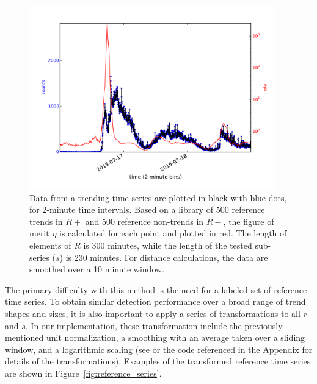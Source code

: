 \documentclass{article}
\begin{document}
\begin{figure}
\begin{center}
\includegraphics[width=0.95\textwidth]{fig/nikolov_trend.pdf} 
\caption{Data from a trending time series are plotted in black with blue dots, for
2-minute time intervals. Based on a library of 500 reference trends in $R+$
and 500 reference non-trends in $R-$, the figure of
merit $\eta$ is calculated for each point and plotted in red. The length of
elements of $R$ is 300 minutes, while the length of the tested sub-series ($s$) is 230
minutes. For distance calculations, the data are smoothed over a 10 minute window.
}
\label{fig:nikolov_eta} 
\end{center}
\end{figure}

The primary difficulty with this method is the need for a labeled set of reference time
series. To obtain similar detection performance over a broad range of trend shapes and sizes, 
it is also important to apply a series of transformations to all $r$ and $s$.
In our implementation, these transformation include the previously-mentioned unit normalization, 
a smoothing with an average taken over a sliding window,
and a logarithmic scaling
(see \cite{Nikolov:2011} or the code referenced in the Appendix
for details of the transformations). 
Examples of the transformed reference time series are shown in Figure~\ref{fig:reference_series}.
\end{document}
